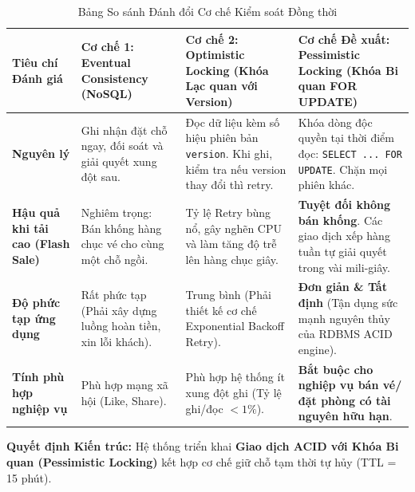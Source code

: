 \begin{table}[h!]
\centering
\small
\begin{tabular}{|p{3.2cm}|p{3.8cm}|p{3.8cm}|p{4.2cm}|}
\hline
\textbf{Tiêu chí Đánh giá} & \textbf{Cơ chế 1: Eventual Consistency (NoSQL)} & \textbf{Cơ chế 2: Optimistic Locking (Khóa Lạc quan với Version)} & \textbf{Cơ chế Đề xuất: Pessimistic Locking (Khóa Bi quan FOR UPDATE)} \\
\hline
\textbf{Nguyên lý} & Ghi nhận đặt chỗ ngay, đối soát và giải quyết xung đột sau. & Đọc dữ liệu kèm số hiệu phiên bản \texttt{version}. Khi ghi, kiểm tra nếu version thay đổi thì retry. & Khóa dòng độc quyền tại thời điểm đọc: \texttt{SELECT ... FOR UPDATE}. Chặn mọi phiên khác. \\
\hline
\textbf{Hậu quả khi tải cao (Flash Sale)} & Nghiêm trọng: Bán khống hàng chục vé cho cùng một chỗ ngồi. & Tỷ lệ Retry bùng nổ, gây nghẽn CPU và làm tăng độ trễ lên hàng chục giây. & \textbf{Tuyệt đối không bán khống}. Các giao dịch xếp hàng tuần tự giải quyết trong vài mili-giây. \\
\hline
\textbf{Độ phức tạp ứng dụng} & Rất phức tạp (Phải xây dựng luồng hoàn tiền, xin lỗi khách). & Trung bình (Phải thiết kế cơ chế Exponential Backoff Retry). & \textbf{Đơn giản \& Tất định} (Tận dụng sức mạnh nguyên thủy của RDBMS ACID engine). \\
\hline
\textbf{Tính phù hợp nghiệp vụ} & Phù hợp mạng xã hội (Like, Share). & Phù hợp hệ thống ít xung đột ghi (Tỷ lệ ghi/đọc $< 1\%$). & \textbf{Bắt buộc cho nghiệp vụ bán vé/đặt phòng có tài nguyên hữu hạn}. \\
\hline
\end{tabular}
\caption{Bảng So sánh Đánh đổi Cơ chế Kiểm soát Đồng thời}
\label{tab:tradeoff_concurrency}
\end{table}

\textbf{Quyết định Kiến trúc:} Hệ thống triển khai \textbf{Giao dịch ACID với Khóa Bi quan (Pessimistic Locking)} kết hợp cơ chế giữ chỗ tạm thời tự hủy (TTL = 15 phút).
